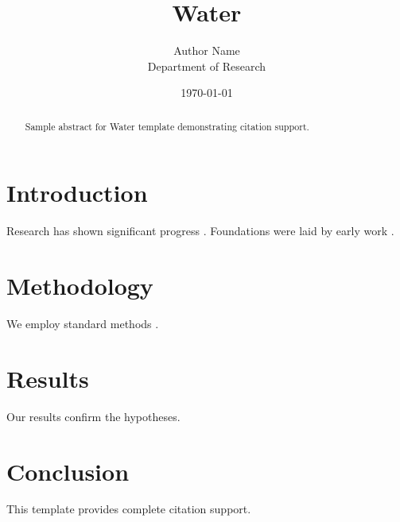 \documentclass{mdpi}
\title{Water}
\author{Author Name \\ \small Department of Research}
\date{\today}
\begin{document}
\maketitle

\begin{abstract}
Sample abstract for Water template demonstrating citation support.
\end{abstract}

\section{Introduction}
Research has shown significant progress \citep{einstein1905}. Foundations were laid by early work \citep{turing1950}.

\section{Methodology}
We employ standard methods \citep{knuth1984}.

\section{Results}
Our results confirm the hypotheses.

\section{Conclusion}
This template provides complete citation support.



\end{document}
